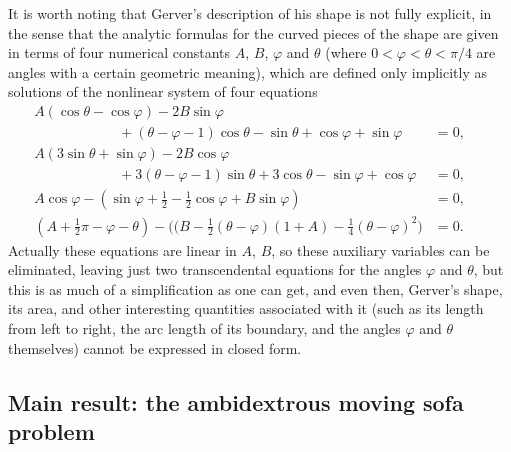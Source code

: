 \documentclass[11pt]{article}
\begin{document}
It is worth noting that Gerver's description of his shape is not fully explicit, in the sense that the analytic formulas for the curved pieces of the shape are given in terms of four numerical constants $A$, $B$, $\varphi$ and $\theta$ (where $0<\varphi<\theta<\pi/4$ are angles with a certain geometric meaning), which are defined only implicitly as solutions of the nonlinear system of four equations
\begin{align}
&A(\cos \theta-\cos\varphi)-2B\sin \varphi
\nonumber \\ & \qquad\qquad\qquad +(\theta-\varphi-1)\cos\theta-\sin\theta+\cos\varphi+\sin\varphi &=0, \qquad\  \label{eq:gerver-nonlinear1} \\
&A(3\sin\theta+\sin\varphi)-2B\cos\varphi
\nonumber \\ & \qquad\qquad\qquad+3(\theta-\varphi-1)\sin\theta+3\cos\theta-\sin\varphi+\cos\varphi
\!\!\!&=0, \qquad \ 
\label{eq:gerver-nonlinear2} \\
&A\cos\varphi-(\sin\varphi+\tfrac12-\tfrac12\cos\varphi+B\sin\varphi)&=0, \qquad \ 
\label{eq:gerver-nonlinear3} \\
&(A+\tfrac12\pi-\varphi-\theta)-\big((B-\tfrac12(\theta-\varphi)(1+A)-\tfrac14(\theta-\varphi)^2\big)&=0.\qquad \ 
\label{eq:gerver-nonlinear4} 
\end{align}
Actually these equations are linear in $A$, $B$, so these auxiliary variables can be eliminated, leaving just two transcendental equations for the angles $\varphi$ and $\theta$, but this is as much of a simplification as one can get, and even then, Gerver's shape, its area, and other interesting quantities associated with it (such as its length from left to right, the arc length of its boundary, and the angles $\varphi$ and $\theta$ themselves) cannot be expressed in closed form. 

\subsection{Main result: the ambidextrous moving sofa problem}
\end{document}
